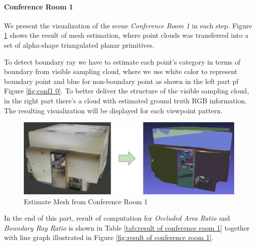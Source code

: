 \documentclass[11pt, a4paper,oneside,chapterprefix=false]{scrbook}
\begin{document}
\paragraph{Conference Room 1} \label{par:conf1 result}

We present the visualization of the scene \textit{Conference Room 1} in each step. Figure \ref{fig:estimate mesh from conference room 1} shows the result of mesh estimation, where point clouds was transferred into a set of alpha-shape triangulated planar primitives.

\vspace{10pt}

To detect boundary ray 
we have to estimate each point's category in terms of boundary from visible sampling cloud, where we use white color to represent boundary point and blue for non-boundary point as shown in the left part pf Figure \ref{fig:conf1 0}. To better deliver the structure of the visible sampling cloud, in the right part there's a cloud with estimated ground truth RGB information. The resulting visualization will be displayed for each viewpoint pattern.

\vspace{30pt}

\begin{figure}[H]
    \centering
    \includegraphics*[width=1.0\textwidth]{figures/estimate conf1.png}
    \caption{Estimate Mesh from Conference Room 1}
    \label{fig:estimate mesh from conference room 1}
\end{figure}

\vspace{30pt}

In the end of this part, result of computation for \textit{Occluded Area Ratio} and \textit{Boundary Ray Ratio} is shown in Table \ref{tab:result of conference room 1} together with line graph illustrated in Figure \ref{fig:result of conference room 1}.
\end{document}
